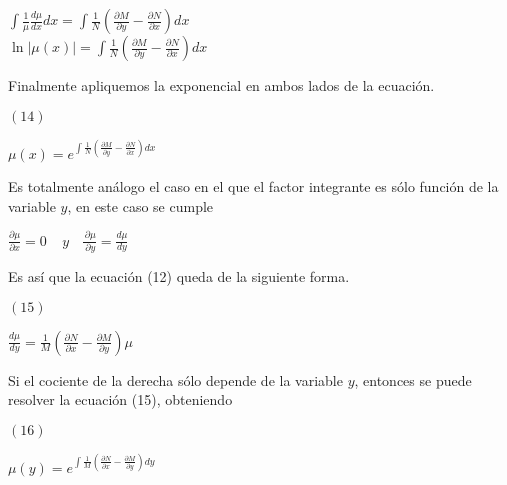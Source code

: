 \documentclass[l etterpaper,11pt]{article}
\begin{document}
\begin{center}

$\int{\frac{1}{\mu}\frac{d\mu}{dx}dx}=\int{\frac{1}{N}\left(\frac{\partial M}{\partial y}-\frac{\partial N}{\partial x}\right)dx}$\\
$\ln{\left|\mu\left(x\right)\right|}=\int{\frac{1}{N}\left(\frac{\partial M}{\partial y}-\frac{\partial N}{\partial x}\right)dx}$\\
\end{center}

Finalmente apliquemos la exponencial en ambos lados de la ecuación.
\begin{flushleft} 
$(14)$
\end{flushleft}

\begin{center}

$\mu(x)=e^{\int\frac{1}{N}(\frac{\partial M}{\partial y}-\frac{\partial N}{\partial x})dx}$\\
\end{center}

Es totalmente análogo el caso en el que el factor integrante es sólo función de la variable $ y $, en este caso se cumple
\begin{center}

$\frac{\partial\mu}{\partial x}=0\ \ \ \ \ y\ \ \ \ \frac{\ \partial\mu}{\ \partial y}=\frac{d\mu}{dy}$\\
\end{center}

Es así que la ecuación (12) queda de la siguiente forma.
\begin{flushleft} 
$(15)$
\end{flushleft}
\begin{center}

$\frac{d\mu}{dy}=\frac{1}{M}(\frac{\partial N}{\partial x}-\frac{\partial M}{\partial y})\mu$\\
\end{center}

Si el cociente de la derecha sólo depende de la variable $ y $, entonces se puede resolver la ecuación (15), obteniendo
\begin{flushleft} 
$(16)$
\end{flushleft}

\begin{center}

$\mu(y)=e^{\int\frac{1}{M}(\frac{\partial N}{\partial x}-\frac{\partial M}{\partial y})dy}$\\
\end{center}
\end{document}
